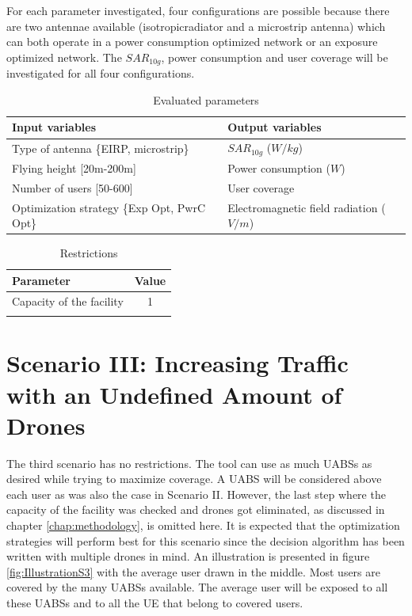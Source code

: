 For each parameter investigated, four configurations are possible because there are two antennae available (\gls{isotropicradiator} and a microstrip antenna) which can both operate in a power consumption optimized network or an exposure optimized 
network. The $SAR_{10g}$, power consumption and user coverage will be investigated for all four configurations.

\begin{table}[h]
\centering
            \begin{tabular}{|l|l|}
            \hline
            \textbf{Input variables  }              & \textbf{Output variables}          \\   \hline 
            Type of antenna  \{EIRP, microstrip\}               & $SAR_{10g}$ ($W/kg$)             \\ 
            Flying height [20m-200m]                 & Power consumption ($W$)          \\ 
            Number of users  [50-600]              & User coverage            \\
            Optimization strategy \{Exp Opt, PwrC Opt\}        &     Electromagnetic field radiation ($V/m$)\\
            \hline
            \end{tabular}
            \caption{Evaluated parameters}
          \label{table:s2:evalpara}
\end{table}
\begin{table}[h]
\centering
        \begin{tabular}{|l|c|}
        \hline
        \textbf{Parameter}            & \textbf{Value}       \\   \hline 
        Capacity of the facility          & 1        \\    
        & \\ 
        \hline
        \end{tabular}
        \caption{Restrictions}
        \label{table:S2:restrictions}
\end{table}




\section{Scenario III: Increasing Traffic with an Undefined Amount of Drones}


The third scenario has no restrictions. The tool can use as much \gls{UABS}s as desired while trying to maximize coverage. 
A \gls{UABS} will be considered above each user as was also the case in Scenario II. However, the last step where the capacity of the facility
was checked and drones got eliminated, as discussed in chapter \ref{chap:methodology}, is omitted here. It is expected that the optimization strategies will perform best for this scenario since the decision algorithm has been written
 with multiple drones in mind. 
An illustration is presented in figure \ref{fig:IllustrationS3} with the average user drawn in the middle.
Most users are covered by the many \gls{UABS}s available. The average user 
will be exposed to all these \gls{UABS}s and to all the \gls{UE} that belong to covered users.

